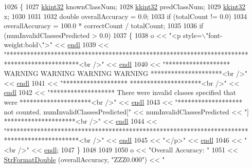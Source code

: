 \begin{DoxyCode}
1026 \{
1027   \hyperlink{namespace_k_k_b_a8fa4952cc84fda1de4bec1fbdd8d5b1b}{kkint32} knownClassNum;
1028   \hyperlink{namespace_k_k_b_a8fa4952cc84fda1de4bec1fbdd8d5b1b}{kkint32} predClassNum;
1029   \hyperlink{namespace_k_k_b_a8fa4952cc84fda1de4bec1fbdd8d5b1b}{kkint32} x;
1030 
1031 
1032   \textcolor{keywordtype}{double}  overallAccuracy = 0.0;
1033   \textcolor{keywordflow}{if}  (totalCount != 0.0)
1034     overallAccuracy = 100.0 * correctCount / totalCount;
1035 
1036   \textcolor{keywordflow}{if}  (numInvalidClassesPredicted > 0.0)
1037   \{
1038     o << \textcolor{stringliteral}{"<p style=\(\backslash\)"font-weight:bold\(\backslash\)">"} << \hyperlink{namespace_k_k_b_ad1f50f65af6adc8fa9e6f62d007818a8}{endl} 
1039       << \textcolor{stringliteral}{"*********************************************************************************************<br
       />"}  << \hyperlink{namespace_k_k_b_ad1f50f65af6adc8fa9e6f62d007818a8}{endl}
1040       << \textcolor{stringliteral}{"*******************        WARNING    WARNING   WARNING  WARNING        *********************<br
       />"}  << \hyperlink{namespace_k_k_b_ad1f50f65af6adc8fa9e6f62d007818a8}{endl}
1041       << \textcolor{stringliteral}{"*******************                                                     *********************<br
       />"}  << \hyperlink{namespace_k_k_b_ad1f50f65af6adc8fa9e6f62d007818a8}{endl}
1042       << \textcolor{stringliteral}{"*******************   There were invalid classes specified that were    *********************<br
       />"}  << \hyperlink{namespace_k_k_b_ad1f50f65af6adc8fa9e6f62d007818a8}{endl}
1043       << \textcolor{stringliteral}{"*******************   not counted.    numInvalidClassesPredicted["} << numInvalidClassesPredicted 
      << \textcolor{stringliteral}{"] *********************<br />"} << \hyperlink{namespace_k_k_b_ad1f50f65af6adc8fa9e6f62d007818a8}{endl}
1044       << \textcolor{stringliteral}{"*********************************************************************************************<br
       />"}  << \hyperlink{namespace_k_k_b_ad1f50f65af6adc8fa9e6f62d007818a8}{endl}
1045       << \textcolor{stringliteral}{"</p>"}   << \hyperlink{namespace_k_k_b_ad1f50f65af6adc8fa9e6f62d007818a8}{endl}
1046       << \textcolor{stringliteral}{"<br />"} << \hyperlink{namespace_k_k_b_ad1f50f65af6adc8fa9e6f62d007818a8}{endl};
1047   \}
1048 
1049 
1050   o << \textcolor{stringliteral}{"Overall Accuracy: "} 
1051     << \hyperlink{namespace_k_k_b_a1a40a40e955fa5417a7cdd990e0021b1}{StrFormatDouble} (overallAccuracy, \textcolor{stringliteral}{"ZZZ0.000"}) << \textcolor{stringliteral}{"%
}
\end{DoxyCode}
